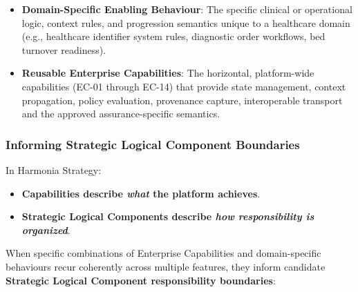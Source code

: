 \begin{itemize}

\item 
\textbf{Domain-Specific Enabling Behaviour}: The specific clinical or operational logic, context rules, and progression semantics unique to a healthcare domain (e.g., healthcare identifier system rules, diagnostic order workflows, bed turnover readiness).



\item 
\textbf{Reusable Enterprise Capabilities}: The horizontal, platform-wide capabilities (EC-01 through EC-14) that provide state management, context propagation, policy evaluation, provenance capture, interoperable transport and the approved assurance-specific semantics.



\end{itemize}
\label{rad:tier-model:154}
\subsubsection*{Informing Strategic Logical Component Boundaries}
\label{rad:tier-model:156}

In Harmonia Strategy:

\label{rad:tier-model:157}

\begin{itemize}

\item 
\textbf{Capabilities describe \emph{what} the platform achieves}.



\item 
\textbf{Strategic Logical Components describe \emph{how responsibility is organized}}.



\end{itemize}
\label{rad:tier-model:160}

When specific combinations of Enterprise Capabilities and domain-specific behaviours recur coherently across multiple features, they inform candidate \textbf{Strategic Logical Component responsibility boundaries}:

\label{rad:tier-model:162}

